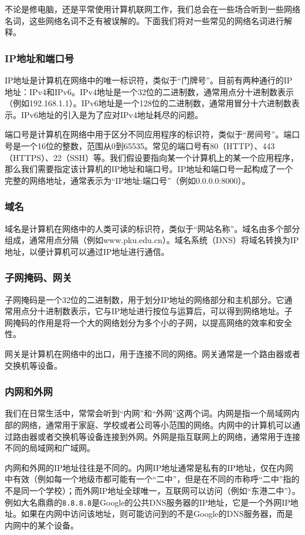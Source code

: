 \documentclass[../main.tex]{subfiles}
\begin{document}
不论是修电脑，还是平常使用计算机联网工作，我们总会在一些场合听到一些网络名词，这些网络名词不乏有被误解的。下面我们将对一些常见的网络名词进行解释。

\subsubsection{IP地址和端口号}
IP地址是计算机在网络中的唯一标识符，类似于“门牌号”。目前有两种通行的IP地址：IPv4和IPv6。IPv4地址是一个32位的二进制数，通常用点分十进制数表示（例如192.168.1.1）。IPv6地址是一个128位的二进制数，通常用冒分十六进制数表示。IPv6地址的引入是为了应对IPv4地址耗尽的问题。

端口号是计算机在网络中用于区分不同应用程序的标识符，类似于“房间号”。端口号是一个16位的整数，范围从0到65535。常见的端口号有80（HTTP）、443（HTTPS）、22（SSH）等。我们假设要指向某一个计算机上的某一个应用程序，那么我们需要指定该计算机的IP地址和端口号。IP地址和端口号一起构成了一个完整的网络地址，通常表示为“IP地址:端口号”（例如0.0.0.0:8000）。

\subsubsection{域名}
域名是计算机在网络中的人类可读的标识符，类似于“网站名称”。域名由多个部分组成，通常用点分隔（例如www.pku.edu.cn）。域名系统（DNS）将域名转换为IP地址，以便计算机可以通过IP地址进行通信。

\subsubsection{子网掩码、网关}

子网掩码是一个32位的二进制数，用于划分IP地址的网络部分和主机部分。它通常用点分十进制数表示，它与IP地址进行按位与运算后，可以得到网络地址。子网掩码的作用是将一个大的网络划分为多个小的子网，以提高网络的效率和安全性。

网关是计算机在网络中的出口，用于连接不同的网络。网关通常是一个路由器或者交换机等设备。

\subsubsection{内网和外网}

我们在日常生活中，常常会听到“内网”和“外网”这两个词。内网是指一个局域网内部的网络，通常用于家庭、学校或者公司等小范围的网络。内网中的计算机可以通过路由器或者交换机等设备连接到外网。外网是指互联网上的网络，通常用于连接不同的局域网和广域网。

内网和外网的IP地址往往是不同的。内网IP地址通常是私有的IP地址，仅在内网中有效（例如每一个地级市都可能有一个“二中”，但是在不同的市称呼“二中”指的不是同一个学校）；而外网IP地址全球唯一，互联网可以访问（例如“东港二中”）。例如大名鼎鼎的\texttt{8.8.8.8}是Google的公共DNS服务器的IP地址，它是一个外网IP地址。如果在内网中访问该地址，则可能访问到的不是Google的DNS服务器，而是内网中的某个设备。
\end{document}
